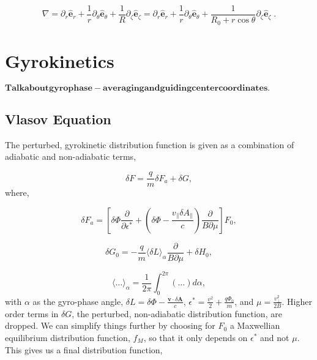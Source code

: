 \documentclass[12pt]{article}
\begin{document}
   \begin{equation}
      \nabla = \partial_r\bm{\hat{e}}_r + \frac{1}{r}\partial_\theta\bm{\hat{e}}_\theta +
               \frac{1}{R}\partial_\zeta\bm{\hat{e}}_\zeta = \partial_r\bm{\hat{e}}_r   +
               \frac{1}{r}\partial_\theta\bm{\hat{e}}_\theta + \frac{1}{R_0 + r\cos\theta}\partial_\zeta\bm{\hat{e}}_\zeta\;.
   \end{equation}

\section{Gyrokinetics}
   \quad $\bm{Talk about gyrophase-averaging and guiding center coordinates.}$

\subsection{Vlasov Equation}
   \quad The perturbed, gyrokinetic distribution function is given as a combination of adiabatic
and non-adiabatic terms\cite{FriemanChen},

   \begin{equation}
      \delta F = \frac{q}{m}\delta F_a + \delta G,
   \end{equation}
where,
    
   \begin{equation}
      \delta F_a = [\delta\Phi\frac{\partial}{\partial\epsilon^*} + (\delta\Phi - \frac{v_\parallel \delta A_\parallel}
                   {c})\frac{\partial}{B\partial\mu}]F_0, 
   \end{equation}
   
   \begin{equation}
      \delta G_0 = -\frac{q}{m}\langle\delta L\rangle_\alpha\frac{\partial}{B\partial\mu} + \delta H_0,
   \end{equation}

   \begin{equation}
      \langle\ldots\rangle_\alpha = \frac{1}{2\pi}\int_{0}^{2\pi}(\ldots)d\alpha,
   \end{equation}
with $\alpha$ as the gyro-phase angle, $\delta L = \delta\Phi - \frac{\bm{v}\cdot\delta\bm{A}}{c}$, $\epsilon^* = \frac{v^2}{2} + 
\frac{q\Phi_0}{m}$, and $\mu = \frac{v_\perp^2}{2B}$. Higher order terms in $\delta G$, the perturbed, non-adiabatic distribution function,
are dropped. We can simplify things further by choosing for $F_0$ a Maxwellian equilibrium distribution function, $f_M$, so that it only depends
on $\epsilon^*$ and not $\mu$. This gives us a final distribution function,
\end{document}
